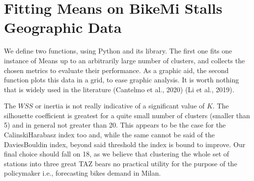 \documentclass[letterpaper,10pt,english]{jupyterBook}
\begin{document}
\section{Fitting \sphinxhyphen{}Means on BikeMi Stalls Geographic Data}
\label{\detokenize{04-stations_kmeans:fitting-k-means-on-bikemi-stalls-geographic-data}}
\sphinxAtStartPar
We define two functions, using Python and its  library. The first one fits one instance of \sphinxhyphen{}Means up to an arbitrarily large number of clusters, and collects the chosen metrics to evaluate their performance. As a graphic aid, the second function plots this data in a grid, to ease graphic analysis. It is worth nothing that  is widely used in the literature (Cantelmo et al., 2020) (Li et al., 2019).

\sphinxAtStartPar
The \(WSS\) or inertia is not really indicative of a significant value of \(K\). The silhouette coefficient is greatest for a quite small number of clusters (smaller than 5) and in general not greater than 20. This appears to be the case for the Calinski\sphinxhyphen{}Harabasz index too and, while the same cannot be said of the Davies\sphinxhyphen{}Bouldin index, beyond said threshold the index is bound to improve. Our final choice should fall on 18, as we believe that clustering the whole set of stations into three great TAZ bears no practical utility for the purpose of the policymaker \sphinxhyphen{} i.e., forecasting bikes demand in Milan.
\end{document}
